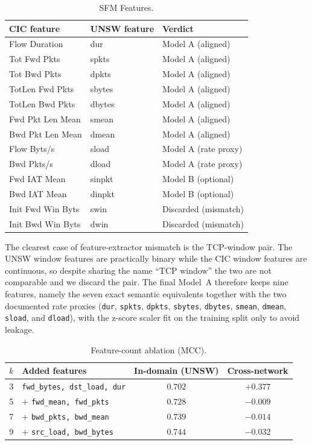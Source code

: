 \documentclass[11pt,a4paper]{article}
\begin{document}
\begin{table}[htbp]
\centering
\caption{SFM Features.}
\label{tab:sfm}
\footnotesize
\begin{tabular}{lll}
\toprule
CIC feature & UNSW feature & Verdict \\
\midrule
Flow Duration     & dur    & Model A (aligned) \\
Tot Fwd Pkts      & spkts  & Model A (aligned) \\
Tot Bwd Pkts      & dpkts  & Model A (aligned) \\
TotLen Fwd Pkts   & sbytes & Model A (aligned) \\
TotLen Bwd Pkts   & dbytes & Model A (aligned) \\
Fwd Pkt Len Mean  & smean  & Model A (aligned) \\
Bwd Pkt Len Mean  & dmean  & Model A (aligned) \\
Flow Byts/s       & sload  & Model A (rate proxy) \\
Bwd Pkts/s        & dload  & Model A (rate proxy) \\
Fwd IAT Mean      & sinpkt & Model B (optional) \\
Bwd IAT Mean      & dinpkt & Model B (optional) \\
Init Fwd Win Byts & swin   & Discarded (mismatch) \\
Init Bwd Win Byts & dwin   & Discarded (mismatch) \\
\bottomrule
\end{tabular}
\end{table}

The clearest case of feature-extractor mismatch is the TCP-window pair. The UNSW
window features are practically binary while the CIC window features are continuous, so
despite sharing the name ``TCP window'' the two are not comparable and we discard the
pair. The final Model~A therefore keeps nine features, namely the seven exact semantic
equivalents together with the two documented rate proxies
(\texttt{dur}, \texttt{spkts}, \texttt{dpkts}, \texttt{sbytes}, \texttt{dbytes},
\texttt{smean}, \texttt{dmean}, \texttt{sload}, and \texttt{dload}), with the z-score
scaler fit on the training split only to avoid leakage.

\begin{table}[htbp]
\centering
\caption{Feature-count ablation (MCC).}
\label{tab:ablation}
\footnotesize
\begin{tabular}{clcc}
\toprule
$k$ & Added features & In-domain (UNSW) & Cross-network \\
\midrule
3 & \texttt{fwd\_bytes, dst\_load, dur} & $0.702$ & $+0.377$ \\
5 & $+$ \texttt{fwd\_mean, fwd\_pkts}   & $0.728$ & $-0.009$ \\
7 & $+$ \texttt{bwd\_pkts, bwd\_mean}   & $0.739$ & $-0.014$ \\
9 & $+$ \texttt{src\_load, bwd\_bytes}  & $0.744$ & $-0.032$ \\
\bottomrule
\end{tabular}
\end{table}
\end{document}
